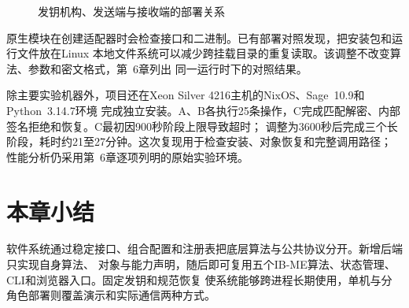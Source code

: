 \begin{figure}[H]
\centering
{}
\caption{发钥机构、发送端与接收端的部署关系}
\label{fig:deployment}
\end{figure}

原生模块在创建适配器时会检查接口和二进制。已有部署对照发现，把安装包和运行文件放在Linux
本地文件系统可以减少跨挂载目录的重复读取。该调整不改变算法、参数和密文格式，第~6章列出
同一运行时下的对照结果。

除主要实验机器外，项目还在Xeon Silver 4216主机的NixOS、Sage~10.9和Python~3.14.7环境
完成独立安装。A、B各执行25条操作，C完成匹配解密、内部签名拒绝和恢复。C最初因900秒阶段上限导致超时；
调整为3600秒后完成三个长阶段，耗时约21至27分钟。这次复现用于检查安装、对象恢复和完整调用路径；
性能分析仍采用第~6章逐项列明的原始实验环境。

\section{本章小结}

软件系统通过稳定接口、组合配置和注册表把底层算法与公共协议分开。新增后端只实现自身算法、
对象与能力声明，随后即可复用五个IB-ME算法、状态管理、CLI和浏览器入口。固定发钥和规范恢复
使系统能够跨进程长期使用，单机与分角色部署则覆盖演示和实际通信两种方式。
